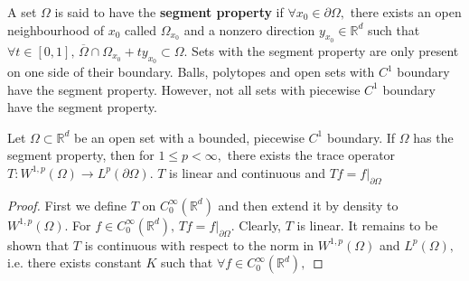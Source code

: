 A set $\Omega$ is said to have the \textbf{segment property} if $\forall x_0\in\partial\Omega,$ there exists an open neighbourhood of $x_0$ called $\Omega_{x_0}$ and a nonzero direction $y_{x_0}\in\mathbb{R}^d$ such that $\forall t\in[0,1],\,\overline{\Omega}\cap\Omega_{x_0}+ty_{x_0}\subset\Omega.$ Sets with the segment property are only present on one side of their boundary. Balls, polytopes and open sets with $C^1$ boundary have the segment property. However, not all sets with piecewise $C^1$ boundary have the segment property.
\begin{theorem}
    Let $\Omega\subset\mathbb{R}^d$  be an open set with a bounded, piecewise $C^1$ boundary. If $\Omega$ has the segment property, then for $1\leq p<\infty,$ there exists the trace operator $T:W^{1,p}(\Omega)\rightarrow L^p(\partial\Omega).$ $T$ is linear and continuous and $Tf=f|_{\partial\Omega}$
\end{theorem}
\begin{proof}
    First we define $T$ on $C_0^\infty(\mathbb{R}^d)$ and then extend it by density to $W^{1,p}(\Omega).$ For $f\in C^\infty_0(\mathbb{R}^d),\,Tf=f|_{\partial\Omega}.$ Clearly, $T$ is linear. It remains to be shown that $T$ is continuous with respect to the norm in $W^{1,p}(\Omega)$ and $L^p(\Omega),$ i.e. there exists constant $K$ such that $\forall f\in C^\infty_0(\mathbb{R}^d),$
\end{proof}


